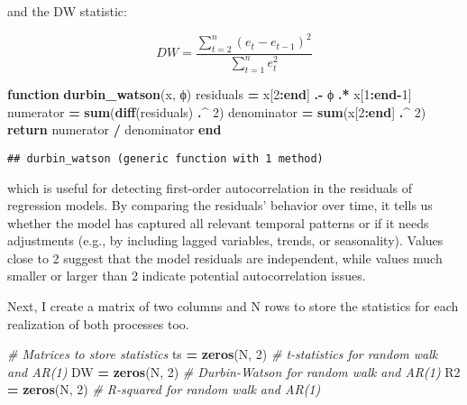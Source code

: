 \documentclass[
]{article}
\newenvironment{Shaded}{\begin{snugshade}}{\end{snugshade}}
\newcommand{\CommentTok}[1]{\textcolor[rgb]{0.56,0.35,0.01}{\textit{#1}}}
\newcommand{\ControlFlowTok}[1]{\textcolor[rgb]{0.13,0.29,0.53}{\textbf{#1}}}
\newcommand{\FloatTok}[1]{\textcolor[rgb]{0.00,0.00,0.81}{#1}}
\newcommand{\FunctionTok}[1]{\textcolor[rgb]{0.13,0.29,0.53}{\textbf{#1}}}
\newcommand{\KeywordTok}[1]{\textcolor[rgb]{0.13,0.29,0.53}{\textbf{#1}}}
\newcommand{\NormalTok}[1]{#1}
\newcommand{\OperatorTok}[1]{\textcolor[rgb]{0.81,0.36,0.00}{\textbf{#1}}}
\begin{document}
and the DW statistic:

\[
DW = \frac{\sum_{t=2}^{n} (e_t - e_{t-1})^2}{\sum_{t=1}^{n} e_t^2}
\]

\begin{Shaded}
\begin{Highlighting}[]
\KeywordTok{function} \FunctionTok{durbin\_watson}\NormalTok{(x, ϕ)}
\NormalTok{    residuals }\OperatorTok{=}\NormalTok{ x[}\FloatTok{2}\OperatorTok{:}\KeywordTok{end}\NormalTok{] }\OperatorTok{.{-}}\NormalTok{ ϕ }\OperatorTok{.*}\NormalTok{ x[}\FloatTok{1}\OperatorTok{:}\KeywordTok{end}\OperatorTok{{-}}\FloatTok{1}\NormalTok{]}
\NormalTok{    numerator }\OperatorTok{=} \FunctionTok{sum}\NormalTok{(}\FunctionTok{diff}\NormalTok{(residuals) }\OperatorTok{.\^{}} \FloatTok{2}\NormalTok{)}
\NormalTok{    denominator }\OperatorTok{=} \FunctionTok{sum}\NormalTok{(x[}\FloatTok{2}\OperatorTok{:}\KeywordTok{end}\NormalTok{] }\OperatorTok{.\^{}} \FloatTok{2}\NormalTok{)}
    \ControlFlowTok{return}\NormalTok{ numerator }\OperatorTok{/}\NormalTok{ denominator}
\KeywordTok{end}
\end{Highlighting}
\end{Shaded}

\begin{verbatim}
## durbin_watson (generic function with 1 method)
\end{verbatim}

which is useful for detecting first-order autocorrelation in the
residuals of regression models. By comparing the residuals' behavior
over time, it tells us whether the model has captured all relevant
temporal patterns or if it needs adjustments (e.g., by including lagged
variables, trends, or seasonality). Values close to 2 suggest that the
model residuals are independent, while values much smaller or larger
than 2 indicate potential autocorrelation issues.

Next, I create a matrix of two columns and N rows to store the
statistics for each realization of both processes too.

\begin{Shaded}
\begin{Highlighting}[]
\CommentTok{\# Matrices to store statistics}
\NormalTok{ts }\OperatorTok{=} \FunctionTok{zeros}\NormalTok{(N, }\FloatTok{2}\NormalTok{)    }\CommentTok{\# t{-}statistics for random walk and AR(1)}
\NormalTok{DW }\OperatorTok{=} \FunctionTok{zeros}\NormalTok{(N, }\FloatTok{2}\NormalTok{)   }\CommentTok{\# Durbin{-}Watson for random walk and AR(1)}
\NormalTok{R2 }\OperatorTok{=} \FunctionTok{zeros}\NormalTok{(N, }\FloatTok{2}\NormalTok{)   }\CommentTok{\# R{-}squared for random walk and AR(1)}
\end{Highlighting}
\end{Shaded}
\end{document}
